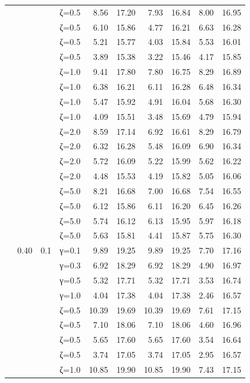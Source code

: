 \begin{table}[htbp]
\begin{tabular}{ll r l  rr  rr  rr}
  &  &  & ζ=0.5 & 8.56 & 17.20 & 7.93 & 16.84 & 8.00 & 16.95 \\
  &  &  & ζ=0.5 & 6.10 & 15.86 & 4.77 & 16.21 & 6.63 & 16.28 \\
  &  &  & ζ=0.5 & 5.21 & 15.77 & 4.03 & 15.84 & 5.53 & 16.01 \\
  &  &  & ζ=0.5 & 3.89 & 15.38 & 3.22 & 15.46 & 4.17 & 15.85 \\
  &  &  & ζ=1.0 & 9.41 & 17.80 & 7.80 & 16.75 & 8.29 & 16.89 \\
  &  &  & ζ=1.0 & 6.38 & 16.21 & 6.11 & 16.28 & 6.48 & 16.34 \\
  &  &  & ζ=1.0 & 5.47 & 15.92 & 4.91 & 16.04 & 5.68 & 16.30 \\
  &  &  & ζ=1.0 & 4.09 & 15.51 & 3.48 & 15.69 & 4.79 & 15.94 \\
  &  &  & ζ=2.0 & 8.59 & 17.14 & 6.92 & 16.61 & 8.29 & 16.79 \\
  &  &  & ζ=2.0 & 6.32 & 16.28 & 5.48 & 16.09 & 6.90 & 16.34 \\
  &  &  & ζ=2.0 & 5.72 & 16.09 & 5.22 & 15.99 & 5.62 & 16.22 \\
  &  &  & ζ=2.0 & 4.48 & 15.53 & 4.19 & 15.82 & 5.05 & 16.06 \\
  &  &  & ζ=5.0 & 8.21 & 16.68 & 7.00 & 16.68 & 7.54 & 16.55 \\
  &  &  & ζ=5.0 & 6.12 & 15.86 & 6.11 & 16.20 & 6.45 & 16.26 \\
  &  &  & ζ=5.0 & 5.74 & 16.12 & 6.13 & 15.95 & 5.97 & 16.18 \\
  &  &  & ζ=5.0 & 5.63 & 15.81 & 4.41 & 15.87 & 5.75 & 16.30 \\
  & 0.40 & 0.1 & γ=0.1 & 9.89 & 19.25 & 9.89 & 19.25 & 7.70 & 17.16 \\
  &  &  & γ=0.3 & 6.92 & 18.29 & 6.92 & 18.29 & 4.90 & 16.97 \\
  &  &  & γ=0.5 & 5.32 & 17.71 & 5.32 & 17.71 & 3.53 & 16.74 \\
  &  &  & γ=1.0 & 4.04 & 17.38 & 4.04 & 17.38 & 2.46 & 16.57 \\
  &  &  & ζ=0.5 & 10.39 & 19.69 & 10.39 & 19.69 & 7.61 & 17.15 \\
  &  &  & ζ=0.5 & 7.10 & 18.06 & 7.10 & 18.06 & 4.60 & 16.96 \\
  &  &  & ζ=0.5 & 5.65 & 17.60 & 5.65 & 17.60 & 3.54 & 16.64 \\
  &  &  & ζ=0.5 & 3.74 & 17.05 & 3.74 & 17.05 & 2.95 & 16.57 \\
  &  &  & ζ=1.0 & 10.85 & 19.90 & 10.85 & 19.90 & 7.43 & 17.15 \\

\end{tabular}
\end{table}
